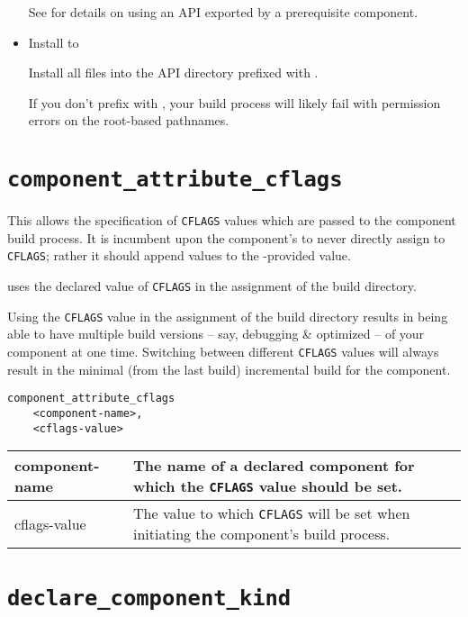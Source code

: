\begin{minipage}{\linewidth}
\begin{itemize}
  See  for details on using an API
  exported by a prerequisite component.

\item Install to \destdir

  Install all files into the API directory prefixed with \destdir.

  If you don't prefix with \destdir, your build process will
  likely fail with permission errors on the root-based pathnames.

\end{itemize}
\end{minipage}

\section{\texttt{component\_attribute\_cflags}}\label{api:cflags}

This allows the specification of \texttt{CFLAGS} values which are
passed to the component build process.  It is incumbent upon the
component's \makefile to never directly assign to \texttt{CFLAGS};
rather it should append values to the \lmsbw-provided value.

\lmsbw uses the declared value of \texttt{CFLAGS} in the assignment of
the build directory.

Using the \texttt{CFLAGS} value in the assignment of the build
directory results in being able to have multiple build versions --
say, debugging \& optimized -- of your component at one time.
Switching between different \texttt{CFLAGS} values will always result
in the minimal (from the last build) incremental build for the
component.

\begin{minipage}{\linewidth}
\begin{verbatim}
component_attribute_cflags
    <component-name>,
    <cflags-value>
\end{verbatim}

\begin{tabularx}{\linewidth}{l|X}
component-name &
  The name of a declared component for which the \texttt{CFLAGS} value
  should be set. \\

\hline cflags-value &
  The value to which \texttt{CFLAGS} will be set when initiating the
  component's build process.
\end{tabularx}
\end{minipage}

\section{\texttt{declare\_component\_kind}}\label{api:kind}

